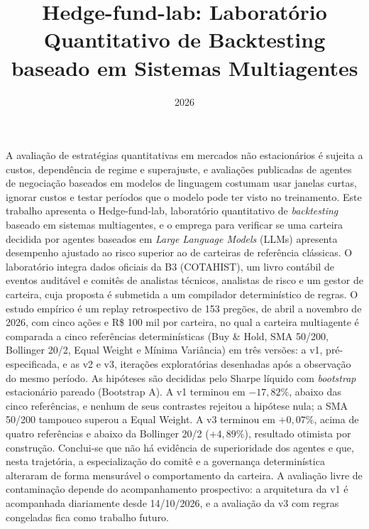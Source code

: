 \documentclass{eic-bcc-tcc}
\title{Hedge-fund-lab: Laboratório Quantitativo de Backtesting baseado em Sistemas Multiagentes}
\date{2026}
\begin{document}
\maketitle

\makeapproval

\begin{resumo}
A avaliação de estratégias quantitativas em mercados não estacionários é sujeita a custos, dependência de regime e superajuste, e avaliações publicadas de agentes de negociação baseados em modelos de linguagem costumam usar janelas curtas, ignorar custos e testar períodos que o modelo pode ter visto no treinamento. Este trabalho apresenta o Hedge-fund-lab, laboratório quantitativo de \textit{backtesting} baseado em sistemas multiagentes, e o emprega para verificar se uma carteira decidida por agentes baseados em \textit{Large Language Models} (LLMs) apresenta desempenho ajustado ao risco superior ao de carteiras de referência clássicas. O laboratório integra dados oficiais da B3 (COTAHIST), um livro contábil de eventos auditável e comitês de analistas técnicos, analistas de risco e um gestor de carteira, cuja proposta é submetida a um compilador determinístico de regras. O estudo empírico é um replay retrospectivo de 153 pregões, de abril a novembro de 2026, com cinco ações e R\$ 100 mil por carteira, no qual a carteira multiagente é comparada a cinco referências determinísticas (Buy \& Hold, SMA 50/200, Bollinger 20/2, Equal Weight e Mínima Variância) em três versões: a v1, pré-especificada, e as v2 e v3, iterações exploratórias desenhadas após a observação do mesmo período. As hipóteses são decididas pelo Sharpe líquido com \textit{bootstrap} estacionário pareado (Bootstrap A). A v1 terminou em $-17{,}82\%$, abaixo das cinco referências, e nenhum de seus contrastes rejeitou a hipótese nula; a SMA 50/200 tampouco superou a Equal Weight. A v3 terminou em $+0{,}07\%$, acima de quatro referências e abaixo da Bollinger 20/2 ($+4{,}89\%$), resultado otimista por construção. Conclui-se que não há evidência de superioridade dos agentes e que, nesta trajetória, a especialização do comitê e a governança determinística alteraram de forma mensurável o comportamento da carteira. A avaliação livre de contaminação depende do acompanhamento prospectivo: a arquitetura da v1 é acompanhada diariamente desde 14/10/2026, e a avaliação da v3 com regras congeladas fica como trabalho futuro.
\end{resumo}
\end{document}
